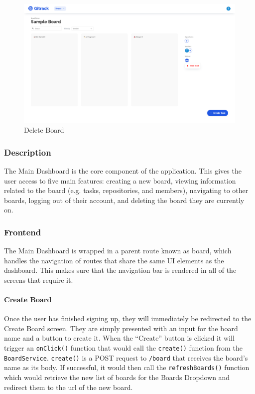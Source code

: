\documentclass{article}
\def\code#1{\texttt{#1}}
\begin{document}
\begin{figure}[H]
	\includegraphics[width=1\textwidth]{board-delete}\par\vspace{0.5cm}
	\caption{Delete Board}
	\label{fig:board-delete}
\end{figure}

\subsubsection{Description}
The Main Dashboard is the core component of the application. This gives the user
access to five main features: creating a new board, viewing information related
to the board (e.g. tasks, repositories, and members), navigating to other
boards, logging out of their account, and deleting the board they are currently
on.

\subsubsection{Frontend}
The Main Dashboard is wrapped in a parent route known as board, which handles
the navigation of routes that share the same UI elements as the dashboard. This
makes sure that the navigation bar is rendered in all of the screens that
require it.

\paragraph{Create Board}
Once the user has finished signing up, they will immediately be redirected to
the Create Board screen. They are simply presented with an input for the board
name and a button to create it. When the “Create” button is clicked it will
trigger an \code{onClick()} function that would call the \code{create()}
function from the \code{BoardService}. \code{create()} is a POST request to
\code{/board} that receives the board’s name as its body. If successful, it
would then call the \code{refreshBoards()} function which would retrieve the new
list of boards for the Boards Dropdown and redirect them to the url of the new
board.
\end{document}
